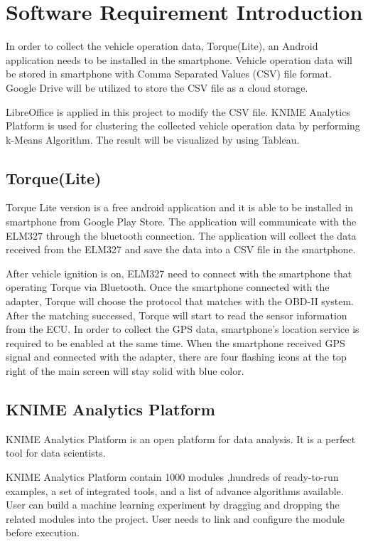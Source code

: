 \section{Software Requirement Introduction}
In order to collect the vehicle operation data, Torque(Lite), an Android application needs to be installed in the smartphone. Vehicle operation data will be stored in smartphone with Comma Separated Values (CSV) file format. Google Drive will be utilized to store the CSV file as a cloud storage.

LibreOffice is applied in this project to modify the CSV file. KNIME Analytics Platform is used for clustering the collected vehicle operation data by performing k-Means Algorithm. The result will be visualized by using Tableau.

\subsection{Torque(Lite)}
Torque Lite version is a free android application and it is able to be installed in smartphone from Google Play Store. The application will communicate with the ELM327 through the bluetooth connection. The application will collect the data received from the ELM327 and  save the data into a CSV file in the smartphone. 

After vehicle ignition is on, ELM327 need to connect with the smartphone that operating Torque via Bluetooth. Once the smartphone connected with the adapter, Torque will choose the protocol that matches with the OBD-II system. After the matching successed, Torque will start to read the sensor information from the ECU. In order to collect the GPS data, smartphone's location service is required to be enabled at the same time. When the smartphone received GPS signal and connected with the adapter, there are four flashing icons at the top right of the main screen will stay solid with blue color.

\subsection{KNIME Analytics Platform}
KNIME Analytics Platform is an open platform for data analysis. It is a perfect tool for data scientists. 

KNIME Analytics Platform contain 1000 modules ,hundreds of ready-to-run examples, a set of integrated tools, and a list of advance algorithms available. User can build a machine learning experiment by dragging and dropping the related modules into the project. User needs to link and configure the module before execution.
